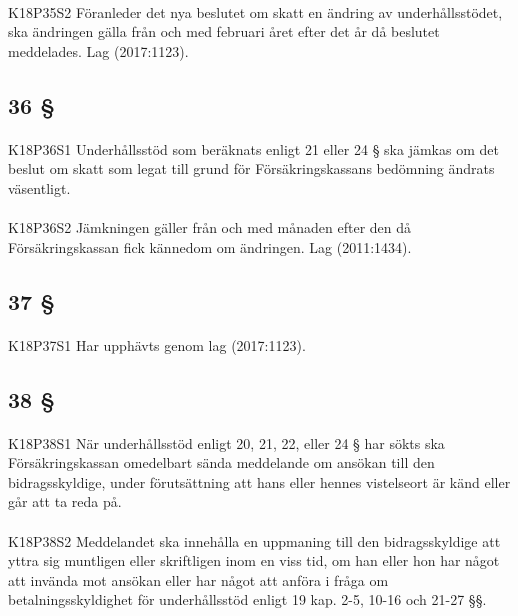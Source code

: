 \documentclass[a4paper,notitlepage,openany,10pt]{book}
\begin{document}
\paragraph*{}
{\tiny K18P35S2}
Föranleder det nya beslutet om skatt en ändring av underhållsstödet, ska ändringen gälla från och med februari året efter det år då beslutet meddelades.
Lag (2017:1123).
\subsection*{36 §}
\paragraph*{}
{\tiny K18P36S1}
Underhållsstöd som beräknats enligt 21 eller 24 § ska jämkas om det beslut om skatt som legat till grund för Försäkringskassans bedömning ändrats väsentligt.
\paragraph*{}
{\tiny K18P36S2}
Jämkningen gäller från och med månaden efter den då Försäkringskassan fick kännedom om ändringen.
Lag (2011:1434).
\subsection*{37 §}
\paragraph*{}
{\tiny K18P37S1}
Har upphävts genom
lag (2017:1123).
\subsection*{38 §}
\paragraph*{}
{\tiny K18P38S1}
När underhållsstöd enligt 20, 21, 22, eller 24 § har sökts ska Försäkringskassan omedelbart sända meddelande om ansökan till den bidragsskyldige, under förutsättning att hans eller hennes vistelseort är känd eller går att ta reda på.
\paragraph*{}
{\tiny K18P38S2}
Meddelandet ska innehålla en uppmaning till den bidragsskyldige att yttra sig muntligen eller skriftligen inom en viss tid, om han eller hon har något att invända mot ansökan eller har något att anföra i fråga om betalningsskyldighet för underhållsstöd enligt 19 kap. 2-5, 10-16 och 21-27 §§.
\end{document}
